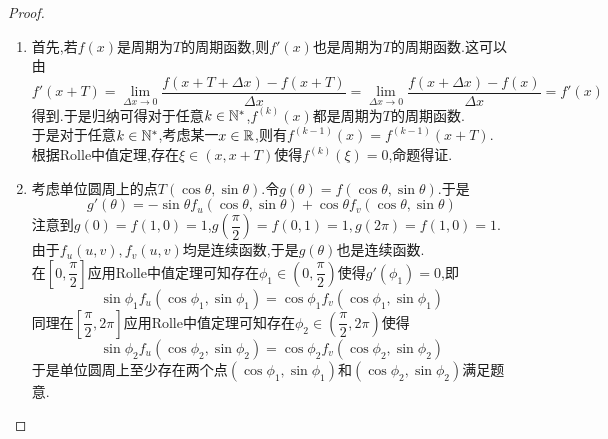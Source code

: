 \documentclass{ctexart}
\begin{document}
\begin{proof}
    \begin{enumerate}[label=\tbf{(\arabic*)}]
        \item 首先,若$f(x)$是周期为$T$的周期函数,则$f'(x)$也是周期为$T$的周期函数.这可以由
            \[f'(x+T)=\lim_{\Delta x\to0}\dfrac{f(x+T+\Delta x)-f(x+T)}{\Delta x}=\lim_{\Delta x\to0}\dfrac{f(x+\Delta x)-f(x)}{\Delta x}=f'(x)\]
            得到.于是归纳可得对于任意$k\in\mathbb{N}^*$,$f^{(k)}(x)$都是周期为$T$的周期函数.\\
            于是对于任意$k\in\mathbb{N}^*$,考虑某一$x\in\mathbb{R}$,则有$f^{(k-1)}(x)=f^{(k-1)}(x+T)$.\\
            根据Rolle中值定理,存在$\xi\in(x,x+T)$使得$f^{(k)}(\xi)=0$,命题得证.
        \item 考虑单位圆周上的点$T(\cos\theta,\sin\theta)$.令$g(\theta)=f(\cos\theta,\sin\theta)$.于是
            \[g'(\theta)=-\sin\theta f_u(\cos\theta,\sin\theta)+\cos\theta f_v(\cos\theta,\sin\theta)\]
            注意到$g(0)=f(1,0)=1$,$g\left(\dfrac\pi2\right)=f(0,1)=1,g(2\pi)=f(1,0)=1$.\\
            由于$f_u(u,v),f_v(u,v)$均是连续函数,于是$g(\theta)$也是连续函数.\\
            在$\left[0,\dfrac\pi2\right]$应用Rolle中值定理可知存在$\phi_1\in\left(0,\dfrac\pi2\right)$使得$g'(\phi_1)=0$,即
            \[\sin\phi_1 f_u(\cos\phi_1,\sin\phi_1)=\cos\phi_1 f_v(\cos\phi_1,\sin\phi_1)\]
            同理在$\left[\dfrac\pi2,2\pi\right]$应用Rolle中值定理可知存在$\phi_2\in\left(\dfrac\pi2,2\pi\right)$使得
            \[\sin\phi_2 f_u(\cos\phi_2,\sin\phi_2)=\cos\phi_2 f_v(\cos\phi_2,\sin\phi_2)\]
            于是单位圆周上至少存在两个点$(\cos\phi_1,\sin\phi_1)$和$(\cos\phi_2,\sin\phi_2)$满足题意.
    \end{enumerate}
\end{proof}
\end{document}
